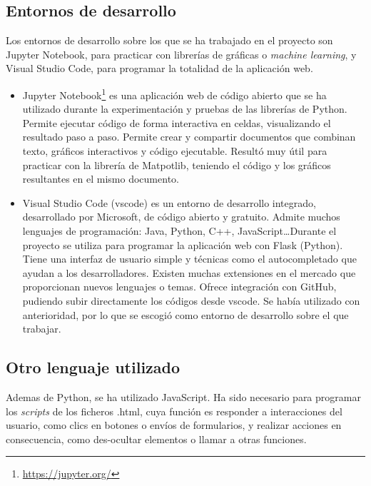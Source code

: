 \subsection{Entornos de desarrollo}
Los entornos de desarrollo sobre los que se ha trabajado en el proyecto son Jupyter Notebook, para practicar con librerías de gráficas o \textit{machine learning}, y Visual Studio Code, para programar la totalidad de la aplicación web.
\begin{itemize}
    \item Jupyter Notebook\footnote{\url{https://jupyter.org/}} es una aplicación web de código abierto que se ha utilizado durante la experimentación y pruebas de las librerías de Python. Permite ejecutar código de forma interactiva en celdas, visualizando el resultado paso a paso. Permite crear y compartir documentos que combinan texto, gráficos interactivos y código ejecutable. Resultó muy útil para practicar con la librería de Matpotlib, teniendo el código y los gráficos resultantes en el mismo documento.
    \item Visual Studio Code (vscode) es un entorno de desarrollo integrado, desarrollado por Microsoft, de código abierto y gratuito. Admite muchos lenguajes de programación: Java, Python, C++, JavaScript\ldots Durante el proyecto se utiliza para programar la aplicación web con Flask (Python). Tiene una interfaz de usuario simple y técnicas como el autocompletado que ayudan a los desarrolladores. Existen muchas extensiones en el mercado que proporcionan nuevos lenguajes o temas. Ofrece integración con GitHub, pudiendo subir directamente los códigos desde vscode. Se había utilizado con anterioridad, por lo que se escogió como entorno de desarrollo sobre el que trabajar.
\end{itemize}



\subsection{Otro lenguaje utilizado}
Ademas de Python, se ha utilizado JavaScript. Ha sido necesario para programar los \textit{scripts} de los ficheros .html, cuya función es responder a interacciones del usuario, como clics en botones o envíos de formularios, y realizar acciones en consecuencia, como des-ocultar elementos o llamar a otras funciones.

